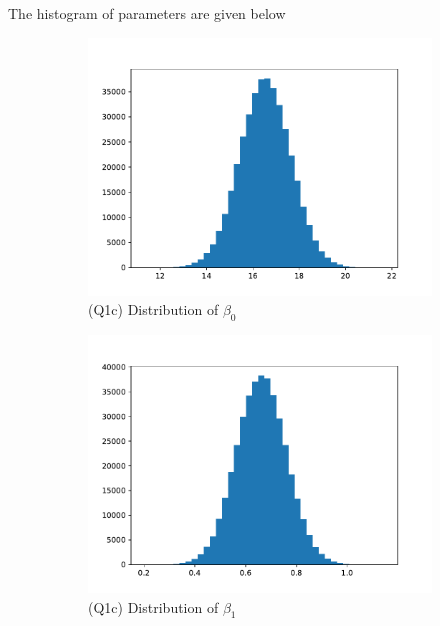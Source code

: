\documentclass{homeworg}
\begin{document}
The histogram of parameters are given below
\begin{figure}[H]
		\caption{Q1(c) Parameter Histogram}
	\begin{subfigure}{0.48\textwidth}
		\centering
		\includegraphics[width=\textwidth]{q1_c_beta0.pdf}
		\caption{(Q1c) Distribution of $\beta_0$}
	\end{subfigure}
	\begin{subfigure}{0.48\textwidth}
		\centering
		\includegraphics[width=\textwidth]{q1_c_beta1.pdf}
		\caption{(Q1c) Distribution of $\beta_1$}
	\end{subfigure}
	\begin{subfigure}{0.48\textwidth}
	\centering

\end{subfigure}
\end{figure}
\end{document}
